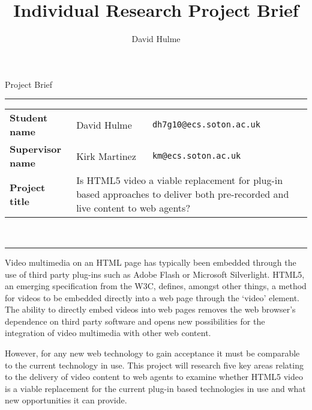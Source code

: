 \documentclass[a4paper]{article}
\title{Individual Research Project Brief}
\author{David Hulme}
\begin{document}
\pagestyle{fancy}
\fancyhead{}
\fancyfoot{}
\fancyfoot[LO,LE]{\thepage}
\fancyfoot[RO, RE]{\today}

\begin{center}
\huge{Project Brief}\\
[1cm]
\end{center}
\hrule
\begin{tabular}{p{5cm}p{4cm}p{4cm}}
    
        \textbf{Student name}         & David Hulme   & \texttt{dh7g10@ecs.soton.ac.uk} \\ 
        \textbf{Supervisor name}      & Kirk Martinez & \texttt{km@ecs.soton.ac.uk}     \\ 
        \textbf{Project title} & \multicolumn{2}{p{10cm}}{Is HTML5 video a viable replacement for plug-in based approaches to deliver both pre-recorded and live content to web agents?} \\

\end{tabular} \\
[0.2cm]
\hrule
\vspace{0.4cm}
Video multimedia on an HTML page has typically been embedded through the use of third party plug-ins such as Adobe Flash or Microsoft Silverlight. HTML5, an emerging specification from the W3C, defines, amongst other things, a method for videos to be embedded directly into a web page through the `video' element. The ability to directly embed videos into web pages removes the web browser's dependence on third party software and opens new possibilities for the integration of video multimedia with other web content.

However, for any new web technology to gain acceptance it must be comparable to the current technology in use. This project will research five key areas relating to the delivery of video content to web agents to examine whether HTML5 video is a viable replacement for the current plug-in based technologies in use and what new opportunities it can provide.
\end{document}
